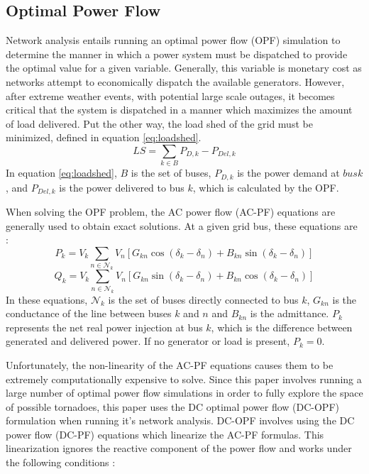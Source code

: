 \documentclass[12pt]{article}
\begin{document}
\subsection{Optimal Power Flow}
Network analysis entails running an optimal power flow (OPF) simulation to determine the manner in which a power system must be dispatched to provide the optimal value for a given variable. Generally, this variable is monetary cost as networks attempt to economically dispatch the available generators. However, after extreme weather events, with potential large scale outages, it becomes critical that the system is dispatched in a manner which maximizes the amount of load delivered. Put the other way, the load shed of the grid must be minimized, defined in equation \eqref{eq:loadshed}.
\begin{equation}
    LS = \sum_{k\in B}P_{D,k} - P_{Del, k}   
    \label{eq:loadshed}
\end{equation}
In equation \eqref{eq:loadshed}, $B$ is the set of buses, $P_{D, k}$ is the power demand at $bus k$, and $P_{Del, k}$ is the power delivered to bus $k$, which is calculated by the OPF. \par
When solving the OPF problem, the AC power flow (AC-PF) equations are generally used to obtain exact solutions. At a given grid bus, these equations are \cite{purchala2005}:
\begin{equation}
    P_k = V_k \sum_{n \in \mathcal{N}_k} V_n \left[ G_{kn} \cos(\delta_k - \delta_n) + B_{kn} \sin(\delta_k - \delta_n) \right]
    \label{eq:ACPFreal}
\end{equation}
\begin{equation}
    Q_k = V_k \sum_{n \in \mathcal{N}_k} V_n \left[ G_{kn} \sin(\delta_k - \delta_n) + B_{kn} \cos(\delta_k - \delta_n) \right]
    \label{eq:ACPFim}
\end{equation}
In these equations, $\mathcal{N}_k$ is the set of buses directly connected to bus $k$, $G_{kn}$ is the conductance of the line between buses $k$ and $n$ and $B_{kn}$ is the admittance. $P_k$ represents the net real power injection at bus $k$, which is the difference between generated and delivered power. If no generator or load is present, $P_k = 0$. \par
Unfortunately, the non-linearity of the AC-PF equations causes them to be extremely computationally expensive to solve. Since this paper involves running a large number of optimal power flow simulations in order to fully explore the space of possible tornadoes, this paper uses the DC optimal power flow (DC-OPF) formulation when running it’s network analysis. DC-OPF involves using the DC power flow (DC-PF) equations which linearize the AC-PF formulas. This linearization ignores the reactive component of the power flow and works under the following conditions \cite{purchala2005}: 
\end{document}
